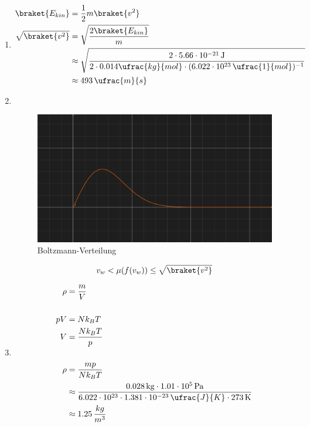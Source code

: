 \documentclass[11pt,letterpaper]{article}
\begin{document}
\begin{enumerate}
\begin{enumerate}
      \item
        \begin{align*}
          \braket{E_{kin}} &= \frac{1}{2}m\braket{v^2}\\
          \sqrt{\braket{v^2}} &= \sqrt{\frac{2 \braket{E_{kin}}}{m}}\\
          &\approx \sqrt{\frac{2 \cdot  5.66  \cdot 10^{-21}\,\mathrm{J}}{2\cdot 0.014\ufrac{kg}{mol} \cdot (6.022\cdot 10^{23} \,\ufrac{1}{mol})^{-1}}}\\
          &\approx 493\,\ufrac{m}{s}
        \end{align*}
\newpage
      \item \, \\
      \begin{figure}[h]
        \centering
        \includegraphics[width = 0.8 \textwidth]{1.png}
        \caption{Boltzmann-Verteilung}
      \end{figure}
      
        \begin{align*}
          v_w < \mu(f(v_w)) \le \sqrt{\braket{v^2}}
        \end{align*}

      \item
        \begin{align*}
          \rho &= \frac{m}{V}\\
          \\
          pV &= Nk_B T\\
          V &= \frac{Nk_BT}{p}\\
          \\
          \rho &= \frac{mp}{Nk_BT}\\
          &\approx \frac{0.028\,\mathrm{kg}\cdot 1.01\cdot 10^{5}\,\mathrm{Pa}}
          {6.022\cdot 10^{23} \cdot 1.381\cdot 10^{-23}\,\ufrac{J}{K} \cdot 273\,\mathrm{K}}\\
          &\approx 1.25 \,\frac{kg}{m^3} 
        \end{align*}


\end{enumerate}
\end{enumerate}
\end{document}
